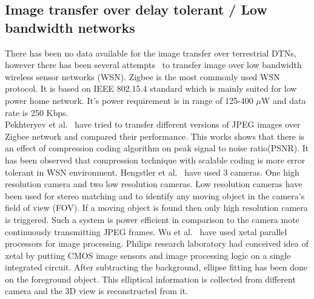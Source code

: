 \subsection{Image transfer over delay tolerant / Low bandwidth networks}
\indent There has been no data available for the image transfer over
terrestrial DTNs, however there has been several attempts~\cite{2, 3,
4, 5} to transfer image over low bandwidth wireless sensor networks
(WSN). Zigbee is the most commonly used WSN protocol. It is based on
IEEE 802.15.4 standard which is mainly suited for low power home
network. It's power requirement is in range of 125-400 $\mu$W and data
rate is 250 Kbps.\\
\indent Pekhteryev et al.~\cite{2} have tried to transfer different
versions of JPEG images over Zigbee network and compared their
performance. This works shows that there is an effect of compression
coding algorithm on peak signal to noise ratio(PSNR). It has been
observed that compression technique with scalable coding is more error
tolerant in WSN environment. Hengstler et al.~\cite{3, 5} have used 3
cameras. One high resolution camera and two low resolution cameras. Low
resolution cameras have been used for stereo matching and to identify
any moving object in the camera's field of view (FOV). If a moving
object is found then only high resolution camera is triggered. Such a
system is power efficient in  comparison to the camera mote continuously
transmitting JPEG frames. Wu et al.~\cite{4} have used xetal parallel
processors for image processing.  Philips research laboratory had
conceived idea of xetal by putting CMOS image sensors and image
processing logic on a single integrated circuit.  After subtracting the
background, ellipse fitting has been done on the foreground object. This
elliptical information is collected from different camera and the 3D
view is reconstructed from it.

